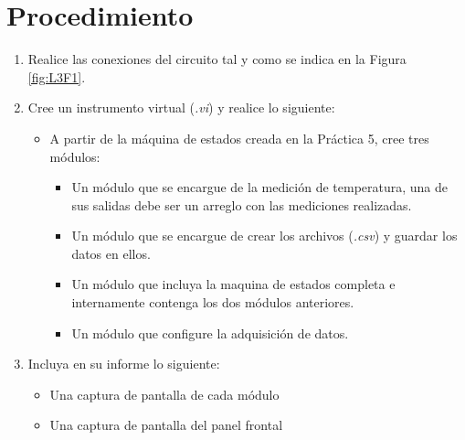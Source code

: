 \documentclass[12pt,letterpaper]{report}
\newcommand{\pro}{Procedimiento}
\begin{document}
\section{\pro}
\begin{enumerate}
\item Realice las conexiones del circuito tal y como se indica en la Figura \ref{fig:L3F1}.
\item Cree un instrumento virtual (\emph{.vi}) y realice lo siguiente:
    \begin{itemize}
        \item A partir de la máquina de estados creada en la Práctica 5, cree tres módulos:
            \begin{itemize}
                \item Un módulo que se encargue de la medición de temperatura, una de sus salidas debe ser un arreglo con las mediciones realizadas.  
                \item Un módulo que se encargue de crear los archivos (\emph{.csv}) y guardar los datos en ellos. 
                \item Un módulo que incluya la maquina de estados completa e internamente contenga los dos módulos anteriores.
                \item Un módulo que configure la adquisición de datos.
            \end{itemize}
    \end{itemize}

\item Incluya en su informe lo siguiente:
    \begin{itemize}
        \item Una captura de pantalla de cada módulo 
        \item Una captura de pantalla del panel frontal
    \end{itemize}
    
\end{enumerate}


% 

% 

\end{document}
